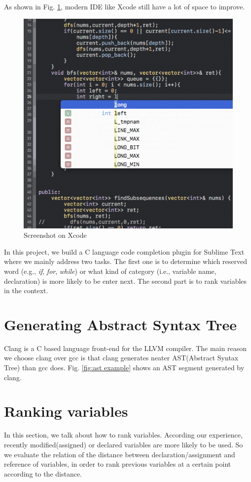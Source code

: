 \documentclass[prodmode,acmtecs]{acmsmall} %
\begin{document}
As shown in Fig. \ref{fig:xcode}, modern IDE like Xcode still have a lot of space to improve. 

\begin{figure}
\centerline{\includegraphics[width=1.0\textwidth]{xcode}}
\caption{Screenshot on Xcode}
\label{fig:xcode}
\end{figure}


In this project, we build a C language code completion plugin for Sublime Text where we mainly address two tasks. The first one is to determine which reserved word (e.g., {\it if}, {\it for}, {\it while}) or what kind of category (i.e., variable name, declaration) is more likely to be enter next. The second part is to rank variables in the context.



\section{Generating Abstract Syntax Tree}
Clang is a C based language front-end for the LLVM compiler\cite{lattner2004llvm}. The main reason we choose clang over gcc is that clang generates neater AST(Abstract Syntax Tree) than gcc does. Fig. \ref{fig:ast example} shows an AST segment generated by clang. 

\section{Ranking variables}
In this section, we talk about how to rank variables. According our experience, recently modified(assigned) or declared variables are more likely to be used. So we evaluate the relation of the distance between declaration/assignment and reference of variables, in order to rank previous variables at a certain point according to the distance. 
\end{document}
